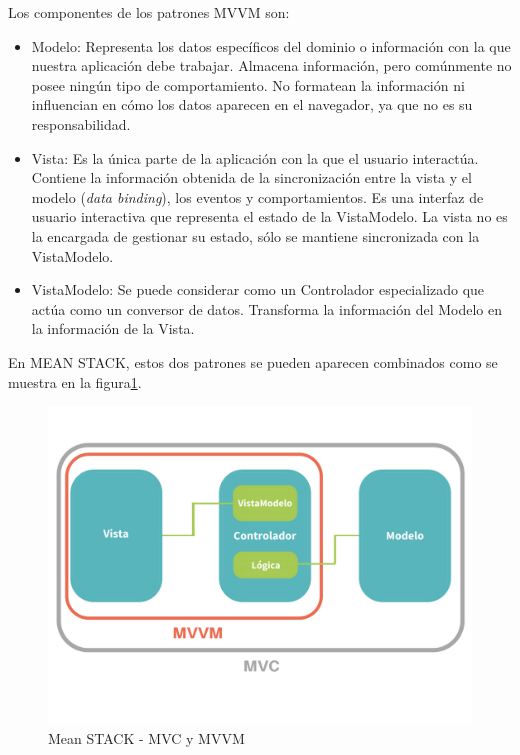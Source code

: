 Los componentes de los patrones MVVM son:


\begin{itemize}
\item Modelo: Representa los datos específicos del dominio o información con la que nuestra aplicación debe trabajar. Almacena información, pero comúnmente no posee ningún tipo de comportamiento. No formatean la información ni influencian en cómo los datos aparecen en el navegador, ya que no es su responsabilidad.
\item Vista: Es la única parte de la aplicación con la que el usuario interactúa. Contiene la información obtenida de la sincronización entre la vista y el modelo (\textit{data binding}\cite{data_binding_w3s}), los eventos y comportamientos. Es una interfaz de usuario interactiva que representa el estado de la VistaModelo. La vista no es la encargada de gestionar su estado, sólo se mantiene sincronizada con la VistaModelo.
\item VistaModelo: Se puede considerar como un Controlador especializado que actúa como un conversor de datos. Transforma la información del Modelo en la información de la Vista\cite{fernandomonteiro2014}. 
\end{itemize}

En MEAN STACK, estos dos patrones se pueden aparecen combinados como se muestra en la figura\ref{fig:mvc_mvvm}.


\begin{figure}[htbp] 
    \centering
    \includegraphics[width=1\textwidth]{figuras/MVC_MVVM.png}
    \caption{Mean STACK - MVC y MVVM}
    \label{fig:mvc_mvvm}
\end{figure}	


